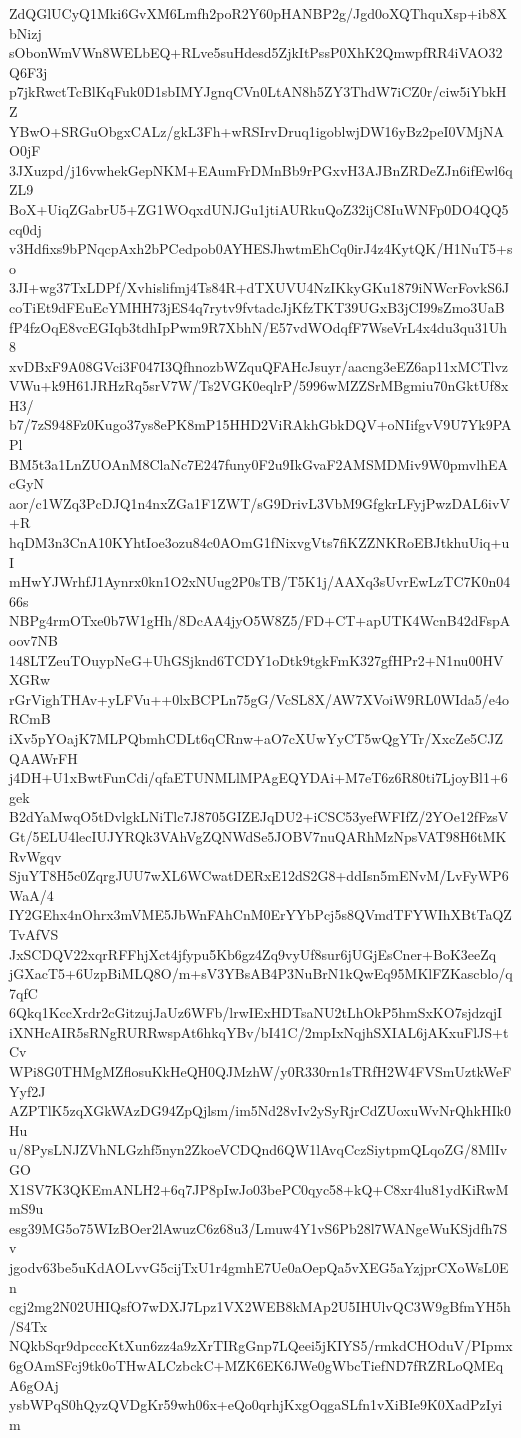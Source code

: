 ZdQGlUCyQ1Mki6GvXM6Lmfh2poR2Y60pHANBP2g/Jgd0oXQThquXsp+ib8XbNizj
sObonWmVWn8WELbEQ+RLve5suHdesd5ZjkItPssP0XhK2QmwpfRR4iVAO32Q6F3j
p7jkRwctTcBlKqFuk0D1sbIMYJgnqCVn0LtAN8h5ZY3ThdW7iCZ0r/ciw5iYbkHZ
YBwO+SRGuObgxCALz/gkL3Fh+wRSIrvDruq1igoblwjDW16yBz2peI0VMjNAO0jF
3JXuzpd/j16vwhekGepNKM+EAumFrDMnBb9rPGxvH3AJBnZRDeZJn6ifEwl6qZL9
BoX+UiqZGabrU5+ZG1WOqxdUNJGu1jtiAURkuQoZ32ijC8IuWNFp0DO4QQ5cq0dj
v3Hdfixs9bPNqcpAxh2bPCedpob0AYHESJhwtmEhCq0irJ4z4KytQK/H1NuT5+so
3JI+wg37TxLDPf/Xvhislifmj4Ts84R+dTXUVU4NzIKkyGKu1879iNWcrFovkS6J
coTiEt9dFEuEcYMHH73jES4q7rytv9fvtadcJjKfzTKT39UGxB3jCI99sZmo3UaB
fP4fzOqE8vcEGIqb3tdhIpPwm9R7XbhN/E57vdWOdqfF7WseVrL4x4du3qu31Uh8
xvDBxF9A08GVci3F047I3QfhnozbWZquQFAHcJsuyr/aacng3eEZ6ap11xMCTlvz
VWu+k9H61JRHzRq5srV7W/Ts2VGK0eqlrP/5996wMZZSrMBgmiu70nGktUf8xH3/
b7/7zS948Fz0Kugo37ys8ePK8mP15HHD2ViRAkhGbkDQV+oNIifgvV9U7Yk9PAPl
BM5t3a1LnZUOAnM8ClaNc7E247funy0F2u9IkGvaF2AMSMDMiv9W0pmvlhEAcGyN
aor/c1WZq3PcDJQ1n4nxZGa1F1ZWT/sG9DrivL3VbM9GfgkrLFyjPwzDAL6ivV+R
hqDM3n3CnA10KYhtIoe3ozu84c0AOmG1fNixvgVts7fiKZZNKRoEBJtkhuUiq+uI
mHwYJWrhfJ1Aynrx0kn1O2xNUug2P0sTB/T5K1j/AAXq3sUvrEwLzTC7K0n0466s
NBPg4rmOTxe0b7W1gHh/8DcAA4jyO5W8Z5/FD+CT+apUTK4WcnB42dFspAoov7NB
148LTZeuTOuypNeG+UhGSjknd6TCDY1oDtk9tgkFmK327gfHPr2+N1nu00HVXGRw
rGrVighTHAv+yLFVu++0lxBCPLn75gG/VcSL8X/AW7XVoiW9RL0WIda5/e4oRCmB
iXv5pYOajK7MLPQbmhCDLt6qCRnw+aO7cXUwYyCT5wQgYTr/XxcZe5CJZQAAWrFH
j4DH+U1xBwtFunCdi/qfaETUNMLlMPAgEQYDAi+M7eT6z6R80ti7LjoyBl1+6gek
B2dYaMwqO5tDvlgkLNiTlc7J8705GIZEJqDU2+iCSC53yefWFIfZ/2YOe12fFzsV
Gt/5ELU4lecIUJYRQk3VAhVgZQNWdSe5JOBV7nuQARhMzNpsVAT98H6tMKRvWgqv
SjuYT8H5c0ZqrgJUU7wXL6WCwatDERxE12dS2G8+ddIsn5mENvM/LvFyWP6WaA/4
IY2GEhx4nOhrx3mVME5JbWnFAhCnM0ErYYbPcj5s8QVmdTFYWIhXBtTaQZTvAfVS
JxSCDQV22xqrRFFhjXct4jfypu5Kb6gz4Zq9vyUf8sur6jUGjEsCner+BoK3eeZq
jGXacT5+6UzpBiMLQ8O/m+sV3YBsAB4P3NuBrN1kQwEq95MKlFZKascblo/q7qfC
6Qkq1KccXrdr2cGitzujJaUz6WFb/lrwIExHDTsaNU2tLhOkP5hmSxKO7sjdzqjI
iXNHcAIR5sRNgRURRwspAt6hkqYBv/bI41C/2mpIxNqjhSXIAL6jAKxuFlJS+tCv
WPi8G0THMgMZflosuKkHeQH0QJMzhW/y0R330rn1sTRfH2W4FVSmUztkWeFYyf2J
AZPTlK5zqXGkWAzDG94ZpQjlsm/im5Nd28vIv2ySyRjrCdZUoxuWvNrQhkHIk0Hu
u/8PysLNJZVhNLGzhf5nyn2ZkoeVCDQnd6QW1lAvqCczSiytpmQLqoZG/8MlIvGO
X1SV7K3QKEmANLH2+6q7JP8pIwJo03bePC0qyc58+kQ+C8xr4lu81ydKiRwMmS9u
esg39MG5o75WIzBOer2lAwuzC6z68u3/Lmuw4Y1vS6Pb28l7WANgeWuKSjdfh7Sv
jgodv63be5uKdAOLvvG5cijTxU1r4gmhE7Ue0aOepQa5vXEG5aYzjprCXoWsL0En
cgj2mg2N02UHIQsfO7wDXJ7Lpz1VX2WEB8kMAp2U5IHUlvQC3W9gBfmYH5h/S4Tx
NQkbSqr9dpcccKtXun6zz4a9zXrTIRgGnp7LQeei5jKIYS5/rmkdCHOduV/PIpmx
6gOAmSFcj9tk0oTHwALCzbckC+MZK6EK6JWe0gWbcTiefND7fRZRLoQMEqA6gOAj
ysbWPqS0hQyzQVDgKr59wh06x+eQo0qrhjKxgOqgaSLfn1vXiBIe9K0XadPzIyim
